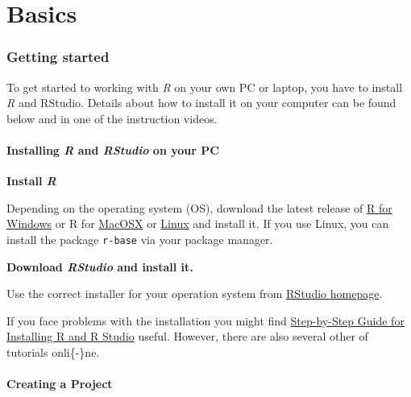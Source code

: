\documentclass[
]{scrartcl}
\makeatletter
\newenvironment{kframe}{%
\medskip{}
\setlength{\fboxsep}{.8em}
 \def\at@end@of@kframe{}%
 \ifinner\ifhmode%
  \def\at@end@of@kframe{\end{minipage}}%
  \begin{minipage}{\columnwidth}%
 \fi\fi%
 \def\FrameCommand##1{\hskip\@totalleftmargin \hskip-\fboxsep
 \colorbox{shadecolor}{##1}\hskip-\fboxsep
     \hskip-\linewidth \hskip-\@totalleftmargin \hskip\columnwidth}%
 \MakeFramed {\advance\hsize-\width
   \@totalleftmargin\z@ \linewidth\hsize
   \@setminipage}}%
 {\par\unskip\endMakeFramed%
 \at@end@of@kframe}
\newenvironment{rmdblock}[1]
  {
  \begin{itemize}
  \renewcommand{\labelitemi}{
    \raisebox{-.7\height}[0pt][0pt]{
      {\setkeys{Gin}{width=3em,keepaspectratio}\texttt{[image: images/\#1]}}
    }
  }
  \setlength{\fboxsep}{1em}
  \begin{kframe}
  \item
  }
  {
  \end{kframe}
  \end{itemize}
  }
\newenvironment{myexercise}
    {\begin{rmdblock}{exercise_green}}
    {\end{rmdblock}}
\makeatother
\begin{document}
\newpage

\part{Basics}\label{part-basics}

\section{Getting started}\label{gettingstarted}

To get started to working with \emph{R} on your own PC or laptop, you have to install \emph{R} and RStudio. Details about how to install it on your computer can be found below and in one of the instruction videos.

\subsection{\texorpdfstring{Installing \emph{R} and \emph{RStudio} on your PC}{Installing R and RStudio on your PC}}\label{installing-r-and-rstudio-on-your-pc}

\begin{myexercise}
\textbf{Install \emph{R}}

Depending on the operating system (OS), download the latest release of
\href{https://cran.rstudio.com/bin/windows/base/}{R for Windows} or R
for
\href{https://www.macobserver.com/tips/how-to/download-install-r-rstudio-mac/}{MacOSX}
or \href{https://cran.rstudio.com/}{Linux} and install it. If you use
Linux, you can install the package \texttt{r-base} via your package
manager.
\end{myexercise}

\begin{myexercise}
\textbf{Download \emph{RStudio} and install it.}

Use the correct installer for your operation system from
\href{https://rstudio.com/products/rstudio/download/\#download}{RStudio
homepage}.
\end{myexercise}

If you face problems with the installation you might find \href{https://techvidvan.com/tutorials/install-r/}{Step-by-Step Guide for Installing R and R Studio} useful. However, there are also several other of tutorials onli\{-\}ne.

\subsection{Creating a Project}\label{creating-a-project}
\end{document}
